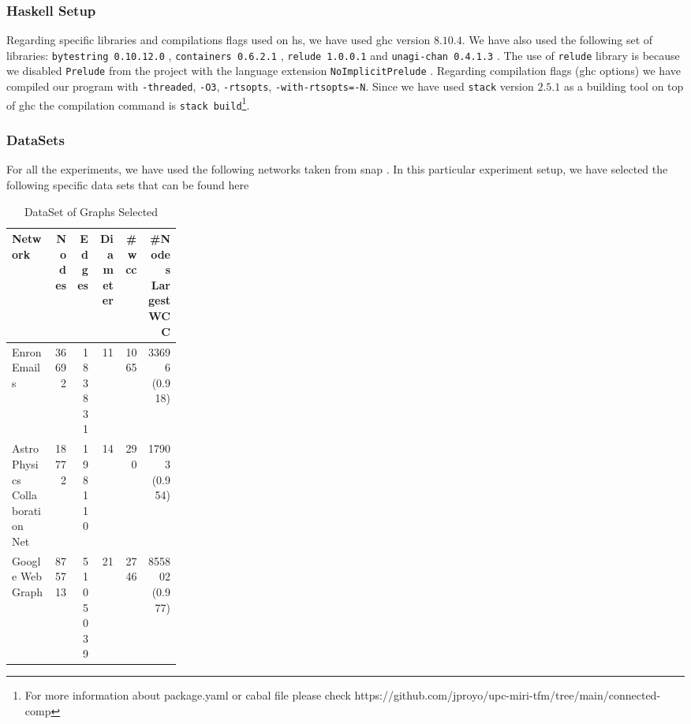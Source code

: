 \subsubsection{Haskell Setup}
Regarding specific libraries and compilations flags used on \acrshort{hs}, we have used \acrshort{ghc} version $8.10.4$. We have also used the following set of libraries: \texttt{bytestring 0.10.12.0} \cite{bytestring}, \texttt{containers 0.6.2.1} \cite{containers}, \texttt{relude 1.0.0.1} \cite{relude} and \texttt{unagi-chan 0.4.1.3} \cite{unagi}. The use of \texttt{relude} library is because we disabled \texttt{Prelude} from the project with the language extension \texttt{NoImplicitPrelude} \cite{extensions}. Regarding compilation flags (\acrshort{ghc} options) we have compiled our program with \texttt{-threaded}, \texttt{-O3}, \texttt{-rtsopts}, \texttt{-with-rtsopts=-N}. Since we have used \texttt{stack} version $2.5.1$ \cite{stack} as a building tool on top of \acrshort{ghc} the compilation command is \texttt{stack build}\footnote{For more information about package.yaml or cabal file please check https://github.com/jproyo/upc-miri-tfm/tree/main/connected-comp}.

\subsubsection{DataSets}\label{data:set}

For all the experiments, we have used the following networks taken from \acrshort{snap} \cite{stanford}. In this particular experiment setup, we have selected the following specific data sets that can be found here \cite{netenron, netastro, netwebgoogle}

\begin{table}[H]
  \centering
  \begin{tabular}{|p{0.25\linewidth}|r|r|r|r|r|}
   \hline
   \textbf{Network} & \textbf{Nodes} & \textbf{Edges} & \textbf{Diameter} & \textbf{\#\acrshort{wcc}} & \textbf{\#Nodes Largest WCC} \\
   \hline
   Enron Emails & 36692 & 183831 & 11 & 1065 & 33696 (0.918) \\
   \hline
   Astro Physics Collaboration Net & 18772 & 198110 & 14 & 290 & 17903 (0.954)\\
   \hline
   Google Web Graph & 875713 & 5105039 & 21 & 2746 & 855802 (0.977)\\
   \hline
  \end{tabular}
 \caption{DataSet of Graphs Selected}
 \label{table:4}
 \end{table}
 
